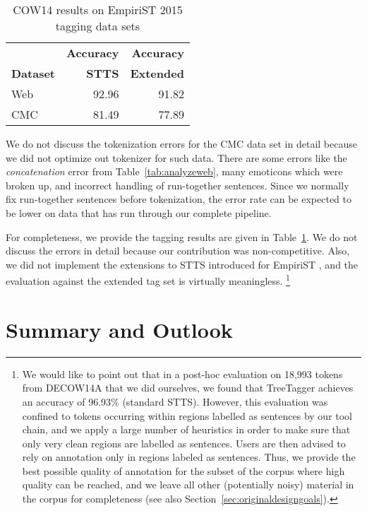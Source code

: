 \documentclass[11pt]{article}
\begin{document}
\begin{table}[!htb]
  \centering
  \begin{tabular}{|l|rr|}
    \hline
                     & \textbf{Accuracy} & \textbf{Accuracy} \\
    \textbf{Dataset} & \textbf{STTS} & \textbf{Extended} \\
    \hline
    Web & 92.96 & 91.82 \\ 
    CMC & 81.49 & 77.89 \\
    \hline
  \end{tabular}
  \caption{COW14 results on EmpiriST 2015 tagging data sets}
  \label{tab:resultstag}
\end{table}

We do not discuss the tokenization errors for the CMC data set in detail because we did not optimize out tokenizer for such data.
There are some errors like the \textit{concatenation} error from Table~\ref{tab:analyzeweb}, many emoticons which were broken up, and incorrect handling of run-together sentences.
Since we normally fix run-together sentences before tokenization, the error rate can be expected to be lower on data that has run through our complete pipeline.

For completeness, we provide the tagging results are given in Table~\ref{tab:resultstag}.
We do not discuss the errors in detail because our contribution was non-competitive.
Also, we did not implement the extensions to STTS introduced for EmpiriST \cite{BeisswengerEa2016}, and the evaluation against the extended tag set is virtually meaningless.%
\footnote{
We would like to point out that in a post-hoc evaluation on 18,993 tokens from DECOW14A that we did ourselves, we found that TreeTagger achieves an accuracy of 96.93\% (standard STTS).
However, this evaluation was confined to tokens occurring within regions labelled as sentences by our tool chain, and we apply a large number of heuristics in order to make sure that only very clean regions are labelled as sentences.
Users are then advised to rely on annotation only in regions labeled as sentences.
Thus, we provide the best possible quality of annotation for the subset of the corpus where high quality can be reached, and we leave all other (potentially noisy) material in the corpus for completeness (see also Section~\ref{sec:originaldesigngoals}).
}

\section{Summary and Outlook}
\label{sec:summaryoutlook}
\end{document}
